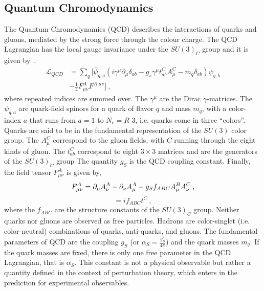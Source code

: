 \subsection*{Quantum Chromodynamics}
The Quantum Chromodynamics (QCD) describes  the interactions of quarks and gluons, mediated by
the strong force through the colour charge.  
The QCD Lagrangian has the local gauge invariance under the  $SU(3)_C$ group and it is given by~\cite{Beringer:1900zz},
\newline
\begin{equation}
\begin{split}
 \mathcal{L}_{QCD}&= \sum_q [\bar{\psi}_{q,a} ( i \gamma^{\mu} \partial_{\mu} \delta_{ab} -g_s \gamma^{\mu} t_{ab}^C A_{\mu}^C -m_q \delta_{ab})\psi_{q,b} \\
&-\frac{1}{4} F_{\mu \nu}^{A}  F^{A \; \mu \nu}] \: , \end{split}  \end{equation}
\newline
where repeated indices are summed over. The $\gamma^{\mu}$ are the Dirac $\gamma$-matrices.
The $\psi_{q,a}$ are quark-field spinors for a quark of flavor $q$ and mass $m_q$, with a color-index $a$
that runs from $a= 1$ to $N_c=R$ 3, i.e. quarks come in three ``colors''. 
Quarks are said to be in the fundamental representation of the $SU(3)$ color group. 
The $A_{\mu}^C$ correspond to the gluon fields, with $C$ running through the eight kinds of gluon.
The $t_{ab}^C$ correspond to eight $3\times 3$ matrices and are the generators of the $SU(3)_C$ group
The quantity $g_S$ is the QCD coupling constant. Finally,
the field tensor $ F_{\mu \nu}^{A}$ is given by,
\newline
\begin{equation}
 F_{\mu \nu}^{A}=  \partial_{\mu} A_{\nu}^A  - \partial_{\nu} A_{\mu}^A -g_{\Large S} f_{ABC}A_{\mu}^B A_{\nu}^C  \: ,   \end{equation}
\begin{equation}
 [t^A, t^B]=i f_{ABC}t^C  \: ,   \end{equation}
\newline
where the $f_{ABC}$ are the structure constants of the $SU(3)_C$ group.
Neither quarks nor gluons are observed as free particles. Hadrons are color-singlet (i.e. color-neutral) combinations of quarks, anti-quarks, and gluons.
The fundamental parameters of QCD are the coupling $g_S$ (or $\alpha_S= \frac{g_S^2}{4\pi}$) and the quark masses $m_q$.
If the quark masses are fixed, there is only one free parameter in the QCD Lagrangian, that is $\alpha_S$. This constant is not a physical observable but
rather  a quantity defined in the context of perturbation theory, which enters in the prediction for experimental observables.


